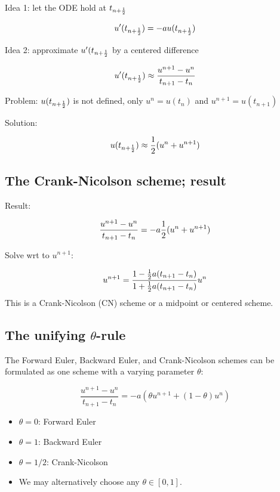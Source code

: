 \documentclass[%
oneside,                 %
final,                   %
10pt]{article}
\begin{document}
Idea 1: let the ODE hold at $t_{n+\half}$

\[ u'(t_{n+\half}) = -au(t_{n+\half})\]

Idea 2: approximate $u'(t_{n+\half}$ by a centered difference

\begin{equation}
u'(t_{n+\half}) \approx \frac{u^{n+1}-u^n}{t_{n+1}-t_n}
\label{decay:CNdiff}
\end{equation}

Problem: $u(t_{n+\half})$ is not defined, only $u^n=u(t_n)$ and $u^{n+1}=u(t_{n+1})$

Solution:

\[ u(t_{n+\half}) \approx \half(u^n + u^{n+1}) \]

\subsection*{The Crank-Nicolson scheme; result}

Result:

\begin{equation}
\frac{u^{n+1}-u^n}{t_{n+1}-t_n} = -a\half (u^n + u^{n+1})
\label{decay:CN1}
\end{equation}

Solve wrt to $u^{n+1}$:

\begin{equation}
u^{n+1} = \frac{1-\half a(t_{n+1}-t_n)}{1 + \half a(t_{n+1}-t_n)}u^n
\label{decay:CN}
\end{equation}
This is a Crank-Nicolson (CN) scheme or a midpoint or centered scheme.


\subsection*{The unifying $\theta$-rule}
\label{decay:schemes:theta}

  

The Forward Euler, Backward Euler, and Crank-Nicolson schemes can be
formulated as one scheme with a varying parameter $\theta$:

\begin{equation}
\frac{u^{n+1}-u^{n}}{t_{n+1}-t_n} = -a (\theta u^{n+1} + (1-\theta) u^{n})
\label{decay:th0}
\end{equation}

\begin{itemize}
 \item $\theta =0$: Forward Euler

 \item $\theta =1$: Backward Euler

 \item $\theta =1/2$: Crank-Nicolson

 \item We may alternatively choose any $\theta\in [0,1]$.
\end{itemize}
\end{document}
